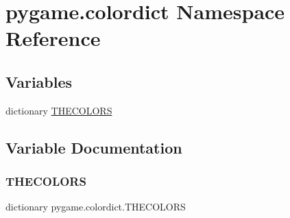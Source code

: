 \hypertarget{namespacepygame_1_1colordict}{}\section{pygame.\+colordict Namespace Reference}
\label{namespacepygame_1_1colordict}
\subsection*{Variables}
\begin{DoxyCompactItemize}
\item 
dictionary \hyperlink{namespacepygame_1_1colordict_adbd149db1d9ccc9b019958be62898633}{T\+H\+E\+C\+O\+L\+O\+RS}
\end{DoxyCompactItemize}


\subsection{Variable Documentation}
\mbox{\label{namespacepygame_1_1colordict_adbd149db1d9ccc9b019958be62898633}} 
\subsubsection{\texorpdfstring{T\+H\+E\+C\+O\+L\+O\+RS}{THECOLORS}}
{\footnotesize\ttfamily dictionary pygame.\+colordict.\+T\+H\+E\+C\+O\+L\+O\+RS}


